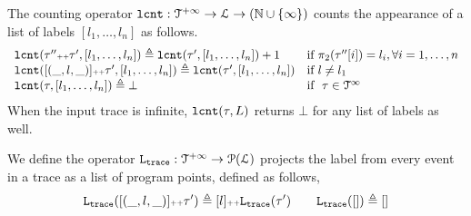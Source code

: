 \begin{defn}
  \label{def:lcounter}
  The counting operator $\mathtt{lcnt} : \mathcal{T}^{+\infty} \to \mathcal{L} \to (\mathbb{N} \cup \{\infty\})$
  counts the appearance of a list of labels $[l_1, \ldots, l_n]$ as follows.
\[
  \begin{array}{ll}
  \mathtt{lcnt}(\mathtt{\tau}'' {\scriptscriptstyle ++} \mathtt{\tau}', [l_1, \ldots, l_n] ) 
  \triangleq \mathtt{lcnt}(\mathtt{\tau}', [l_1, \ldots, l_n]) + 1  & \text{if}~ \pi_2(\mathtt{\tau}''[i]) = l_i, \forall i = 1, \ldots, n
  \\ 
  \mathtt{lcnt}([(\_, l, \_)] {\scriptscriptstyle ++} \mathtt{\tau}', [l_1, \ldots, l_n] ) 
  \triangleq \mathtt{lcnt}(\mathtt{\tau}', [l_1, \ldots, l_n]) & \text{if}~ l \neq l_1
  \\ 
  \mathtt{lcnt}(\mathtt{\tau}, [l_1, \ldots, l_n] ) 
  \triangleq \bot & \text{if }~ \mathtt{\tau} \in \mathcal{T}^{\infty}
\end{array}
\]
{When the input trace is infinite, $\mathtt{lcnt}(\mathtt{\tau}, L)$ returns $\bot$ for any list of labels as well.}
\end{defn}
%
We define the operator $\mathtt{L}_{\mathtt{{trace}}} : \mathcal{T}^{+\infty} \to \mathcal{P}{(\mathcal{L})}$ projects the label from every event in a trace as a list of program points,
defined as follows,
\[
\mathtt{L}_{\mathtt{{trace}}}([(\_, l, \_)] {\scriptscriptstyle ++} \mathtt{\tau}') \triangleq [l] {\scriptscriptstyle ++} \mathtt{L}_{\mathtt{{trace}}}(\mathtt{\tau}')
\qquad
\mathtt{L}_{\mathtt{{trace}}}([ ]) \triangleq []
\]